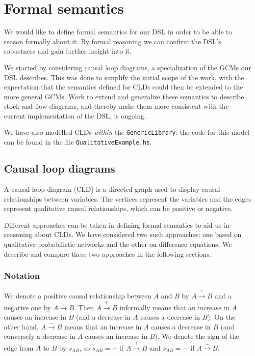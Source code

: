 \section{Formal semantics}
\label{sec:semantics}
We would like to define formal semantics for our DSL in order to be
able to reason formally about it.
%
By formal reasoning we can confirm the DSL's robustness and gain
further insight into it.

We started by considering causal loop diagrams, a specialization of
the GCMs our DSL describes.
%
This was done to simplify the initial scope of the work, with the
expectation that the semantics defined for CLDs could then be extended
to the more general GCMs.
%
Work to extend and generalize these semantics to describe
stock-and-flow diagrams, and thereby make them more consistent with
the current implementation of the DSL, is ongoing.

We have also modelled CLDs \emph{within} the \verb|GenericLibrary|:
the code for this model can be found in the file
\verb|QualitativeExample.hs|.

\subsection{Causal loop diagrams}
%
A causal loop diagram (CLD) is a directed graph used to display causal
relationships between variables.
%
The vertices represent the variables and the edges represent
qualitative causal relationships, which can be positive or negative.

Different approaches can be taken in defining formal semantics to aid
us in reasoning about CLDs.
%
We have considered two such approaches: one based on qualitative
probabilistic networks and the other on difference equations.
%
We describe and compare these two approaches in the following
sections.

\subsubsection{Notation}
We denote a positive causal relationship between $A$ and $B$ by
$A\xrightarrow{+} B$ and a negative one by $A \xrightarrow{-} B$.
%
Then $A \xrightarrow{+} B$ informally means that an increase in $A$
causes an increase in $B$ (and a decrease in $A$ causes a decrease in
$B$).
%
On the other hand, $A\xrightarrow{-} B$ means that an increase in $A$
causes a decrease in $B$ (and conversely a decrease in $A$ causes an
increase in $B$).
%
We denote the sign of the edge from $A$ to $B$ by $s_{AB}$, so
$s_{AB}= +$ if $A\xrightarrow{+} B$ and $s_{AB}=-$ if
$A\xrightarrow{-} B$.

